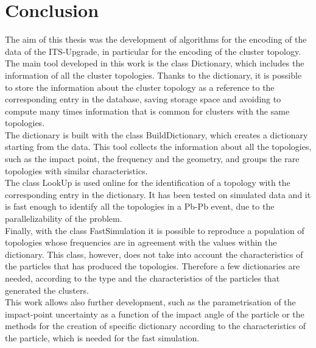 \chapter{Conclusion}
The aim of this thesis was the development of algorithms for the encoding of the data of the ITS-Upgrade, in particular for the encoding of the cluster topology.\\
The main tool developed in this work is the class Dictionary, which includes the information of all the cluster topologies. Thanks to the dictionary, it is possible to store the information about the cluster topology as a reference to the corresponding entry in the database, saving storage space and avoiding to compute many times information that is common for clusters with the same topologies.\\
The dictionary is built with the class BuildDictionary, which creates a dictionary starting from the data. This tool collects the information about all the topologies, such as the impact point, the frequency and the geometry, and groups the rare topologies with similar characteristics.\\
The class LookUp is used online for the identification of a topology with the corresponding entry in the dictionary. It has been tested on simulated data and it is fast enough to identify all the topologies in a Pb-Pb event, due to the parallelizability of the problem.\\
Finally, with the class FastSimulation it is possible to reproduce a population of topologies whose frequencies are in agreement with the values within the dictionary. This class, however, does not take into account the characteristics of the particles that has produced the topologies. Therefore a few dictionaries are needed, according to the type and the characteristics of the particles that generated the clusters.\\
This work allows also further development, such as the parametrisation of the impact-point uncertainty as a function of the impact angle of the particle or the methods for the creation of specific dictionary according to the characteristics of the particle, which is needed for the fast simulation. 
